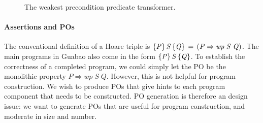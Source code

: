 \documentclass[runningheads]{llncs}
\newcommand{\Conid}[1]{\mathit{#1}}
\newcommand{\Varid}[1]{\mathit{#1}}
\def\resethooks{%
  \global\let\SaveRestoreHook\empty
  \global\let\ColumnHook\empty}
\newlength{\blanklineskip}
\let\Varid\mathit
\let\Conid\mathit
\newcounter{linenum}
\newcommand{\numbersoff}{\global\let\printline\empty}
\newcommand{\numbersreset}{\setcounter{linenum}{0}}
\begin{document}
\begin{figure}[t]
\resethooks
\numbersoff
\numbersreset
\caption{The weakest precondition predicate transformer.}
\label{fig:wp}
\end{figure}

\paragraph{Assertions and POs}
The conventional definition of a Hoare triple is \ensuremath{\htriple{\Conid{P}}{\Conid{S}}{\Conid{Q}}\,\mathrel{=}\,(\Conid{P}\mathrel{\Rightarrow}\Varid{wp}\;\Conid{S}\;\Conid{Q})}.
The main programs in Guabao also come in the form \ensuremath{\htriple{\Conid{P}}{\Conid{S}}{\Conid{Q}}}.
To establish the correctness of a completed program, we could simply let the PO be the monolithic property \ensuremath{\Conid{P}\mathrel{\Rightarrow}\Varid{wp}\;\Conid{S}\;\Conid{Q}}.
However, this is not helpful for program construction.
We wish to produce POs that give hints to each program component that needs to be constructed.
PO generation is therefore an design issue:
we want to generate POs that are useful for program construction, and moderate in size and number.
\end{document}
